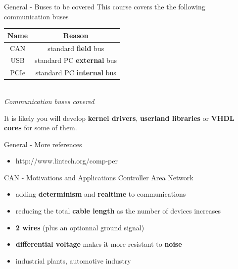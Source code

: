 \begin{frame}{General - Buses to be covered}
  This course covers the the following communication buses

  \smallskip
  \begin{center}
    \begin{tabular}{|c|c|}
      \hline
      \textbf{Name} & \textbf{Reason} \\
      \hline
      CAN & standard \textbf{field} bus \\
      \hline
      USB &  standard PC \textbf{external} bus \\
      \hline
      PCIe & standard PC \textbf{internal} bus \\
      \hline
    \end{tabular}
    \smallskip
    \begin{tiny}
      \textit{\\Communication buses covered}
    \end{tiny}
  \end{center}

  It is likely you will develop \textbf{kernel drivers}, \textbf{userland libraries} or
  \textbf{VHDL cores} for some of them.

\end{frame}

\begin{frame}{General - More references}
  \begin{itemize}
  \item http://www.lintech.org/comp-per
  \end{itemize}
\end{frame}


\begin{frame}{CAN - Motivations and Applications}
  Controller Area Network
  \begin{itemize}
  \item adding \textbf{determinism} and \textbf{realtime} to communications
  \item reducing the total \textbf{cable length} as the number of devices increases
  \item \textbf{2 wires} (plus an optionnal ground signal)
  \item \textbf{differential voltage} makes it more resistant to \textbf{noise}
  \item industrial plants, automotive industry
  \end{itemize}
\end{frame}


